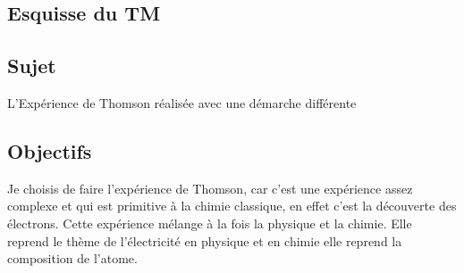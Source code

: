 \documentclass[../main.tex]{subfiles}
\begin{document}
\subsection{Esquisse du TM}

\subsection{Sujet}
L'Expérience de Thomson réalisée avec une démarche différente 

\subsection{Objectifs}


Je choisis de faire l'expérience de Thomson, car c'est une expérience assez complexe et qui est primitive à la chimie classique, en effet c'est la découverte des électrons. Cette expérience mélange à la fois la physique et la chimie. Elle reprend le thème de l'électricité en physique et en chimie elle reprend la composition de l'atome.
 
 

\end{document}
